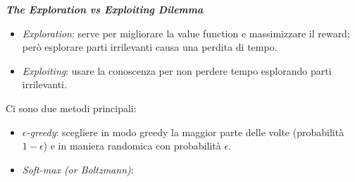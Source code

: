 \documentclass[a4paper, notitlepage, 9pt]{extreport}
\begin{document}
\noindent
\textit{\textbf{The Exploration vs Exploiting Dilemma}}
\begin{itemize}
	\item \textit{Exploration}: serve per migliorare la value function e massimizzare il reward; però esplorare parti irrilevanti causa una perdita di tempo.
	\item \textit{Exploiting}: usare la conoscenza per non perdere tempo esplorando parti irrilevanti.
\end{itemize}
Ci sono due metodi principali:
\begin{itemize}
	\item $\epsilon$\textit{-greedy}: scegliere in modo greedy la maggior parte delle volte (probabilità $1-\epsilon$) e in maniera randomica con probabilità $\epsilon$.
	\item \textit{Soft-max (or Boltzmann)}:
\end{itemize}
\end{document}
